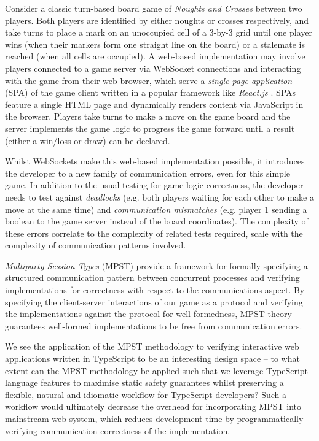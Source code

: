 \documentclass[submission,copyright,creativecommons]{eptcs}
\begin{document}
Consider a classic turn-based board game of \textit{Noughts and Crosses} between two players. Both players are identified by either noughts or crosses respectively, and take turns to place a mark on an unoccupied cell of a 3-by-3 grid until one player wins (when their markers form one straight line on the board) or a stalemate is reached (when all cells are occupied). A web-based implementation may involve players connected to a game server via WebSocket connections and interacting with the game from their web browser, which serve a \textit{single-page application} (SPA) of the game client written in a popular framework like \textit{React.js} \cite{React}. SPAs feature a single HTML page and dynamically renders content via JavaScript in the browser. Players take turns to make a move on the game board and the server implements the game logic to progress the game forward until a result (either a win/loss or draw) can be declared. 

Whilst WebSockets make this web-based implementation possible, it introduces the developer to a new family of communication errors, even for this simple game. In addition to the usual testing for game logic correctness, the developer needs to test against \textit{deadlocks} (e.g. both players waiting for each other to make a move at the same time) and \textit{communication mismatches} (e.g. player 1 sending a boolean to the game server instead of the board coordinates). The complexity of these errors correlate to the complexity of related tests required, scale with the complexity of communication patterns involved.

\textit{Multiparty Session Types} (MPST) \cite{MPST} provide a framework for formally specifying a structured communication pattern between concurrent processes and verifying implementations for correctness with respect to the communications aspect. By specifying the client-server interactions of our game as a protocol and verifying the implementations against the protocol for well-formedness, MPST theory guarantees well-formed implementations to be free from communication errors.

We see the application of the MPST methodology to verifying
interactive web applications written in TypeScript to be an
interesting design space -- to what extent can the MPST methodology be
applied such that we leverage TypeScript language features to maximise
static safety guarantees whilst preserving a flexible, natural and
idiomatic workflow for TypeScript developers? Such a workflow would
ultimately decrease the overhead for incorporating MPST into
mainstream web system, which reduces development time by
programmatically
verifying communication correctness of the implementation. 
\end{document}
